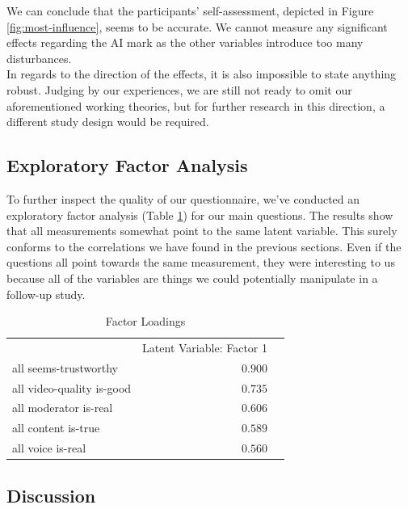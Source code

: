 \documentclass[
  a4paper,  %
  twoside,  %
  bibliography=totoc,
  headsepline,
  cleardoublepage=empty,
  parskip=half,
  draft=false
]{scrbook}
\begin{document}
We can conclude that the participants' self-assessment, depicted in Figure \ref{fig:most-influence}, seems to be accurate. We cannot measure any significant effects regarding the AI mark as the other variables introduce too many disturbances. \\
In regards to the direction of the effects, it is also impossible to state anything robust. Judging by our experiences, we are still not ready to omit our aforementioned working theories, but for further research in this direction, a different study design would be required.

 \subsection{Exploratory Factor Analysis}
\label{subsec:factor-analysis}

To further inspect the quality of our questionnaire, we've conducted an exploratory factor analysis (Table \ref{tab:factorLoadings}) for our main questions. The results show that all measurements somewhat point to the same latent variable. This surely conforms to the correlations we have found in the previous sections. Even if the questions all point towards the same measurement, they were interesting to us because all of the variables are things we could potentially manipulate in a follow-up study.

\begin{table}[h]
	\centering
	\caption{Factor Loadings}
	\label{tab:factorLoadings}
	{
		\begin{tabular}{lrr}
			\toprule
			 & Latent Variable: Factor 1  \\
			\cmidrule[0.4pt]{1-3}
			all seems-trustworthy & $0.900$  \\
			all video-quality is-good & $0.735$  \\
			all moderator is-real & $0.606$  \\
			all content is-true & $0.589$  \\
			all voice is-real & $0.560$  \\
			\bottomrule
		\end{tabular}
	}
\end{table}

\subsection{Discussion}
\end{document}

